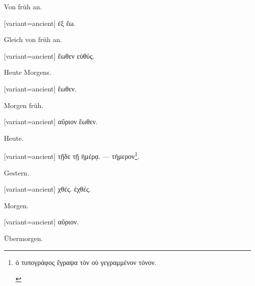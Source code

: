 Von früh an.

\switchcolumn

\begin{greek}[variant=ancient]%
ἐξ ἕω.

\end{greek}%
\switchcolumn*

Gleich von früh an.

\switchcolumn

\begin{greek}[variant=ancient]%
ἕωθεν εὐθύς.

\end{greek}%
\switchcolumn*

Heute Morgens.

\switchcolumn

\begin{greek}[variant=ancient]%
ἕωθεν.

\end{greek}%
\switchcolumn*

Morgen früh.

\switchcolumn

\begin{greek}[variant=ancient]%
αὔριον ἕωθεν.

\end{greek}%
\switchcolumn*

Heute.

\switchcolumn

\begin{greek}[variant=ancient]%
τῇδε τῇ ἡμέρᾳ. --- τήμερον\footnote{\begin{latin}%
\textgreek[variant=ancient]{ὁ τυπογράφος ἔγραψα τὸν οὐ γεγραμμένον
τόνον.}\end{latin}%
}.

\end{greek}%
\switchcolumn*

Gestern.

\switchcolumn

\begin{greek}[variant=ancient]%
χθές. ἐχθές.

\end{greek}%
\switchcolumn*

Morgen.

\switchcolumn

\begin{greek}[variant=ancient]%
αὔριον.

\end{greek}%
\switchcolumn*

Übermorgen.

